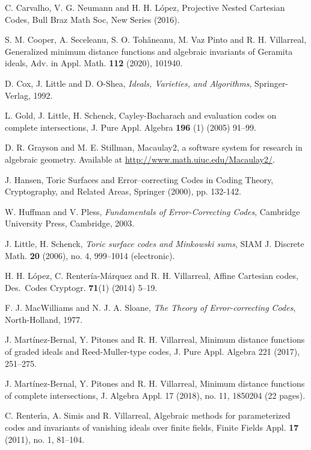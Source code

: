\documentclass[12pt]{amsart}
\theoremstyle{plain}
\begin{document}
\begin{thebibliography}{99}

 C. Carvalho, V. G. Neumann and H. H. L\'opez,
Projective Nested Cartesian Codes,
Bull Braz Math Soc, New Series (2016).

 S. M. Cooper, A. Seceleanu, S. O. Toh\v{a}neanu,
M. Vaz Pinto and R. H. Villarreal, 
Generalized minimum distance functions and algebraic invariants of
Geramita ideals, Adv. in Appl. Math. {\bf 112} (2020), 101940.

D. Cox, J. Little and D. O-Shea,
{\it Ideals, Varieties, and Algorithms}, Springer-Verlag, 1992.

 L. Gold, J. Little, H. Schenck,
{Cayley-Bacharach and evaluation codes on complete intersections},
 J. Pure Appl. Algebra  {\bf 196} (1) (2005) 91--99.

 D. R. Grayson and M. E. Stillman,
Macaulay2, a software system for research in algebraic geometry.
Available at \url{http://www.math.uiuc.edu/Macaulay2/}.

 J. Hansen, { Toric Surfaces and Error--correcting
    Codes} in Coding Theory, Cryptography, and Related Areas, Springer
 (2000), pp. 132-142.

 W. Huffman and V. Pless,
{\it Fundamentals of Error-Correcting Codes},
Cambridge University Press, Cambridge, 2003.

 J. Little, H. Schenck,
{\em Toric surface codes and Minkowski sums},
SIAM J. Discrete Math. {\bf  20}  (2006),  no. 4, 999--1014 (electronic).

 H. H. L\'opez, C. Renter\'ia-M\'arquez and R. H. Villarreal,
Affine Cartesian codes,
Des.\ Codes Cryptogr. \textbf{71}(1) (2014) 5--19.

 F. J. MacWilliams and N. J. A. Sloane, 
{\it The Theory of Error-correcting Codes}, North-Holland, 1977.

 J. Mart\'inez-Bernal, Y. Pitones and R. H. Villarreal,
Minimum distance functions of graded ideals and Reed-Muller-type codes,
J. Pure Appl. Algebra 221 (2017), 251--275.


 J. Mart\'inez-Bernal, Y. Pitones and R. H. Villarreal,
Minimum distance functions of complete intersections,
J. Algebra Appl. 17 (2018), no. 11, 1850204 (22 pages).

 C. Renter\'\i a, A. Simis and R. Villarreal,
Algebraic methods for parameterized codes and invariants of vanishing ideals over finite fields,
Finite Fields Appl. {\bf 17} (2011), no. 1, 81--104.


\end{thebibliography}
\end{document}
